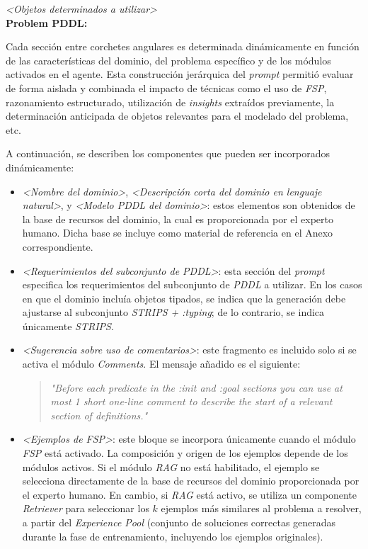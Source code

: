 \begin{anexes}
\begin{tcolorbox}[colback=gray!10!white, colframe=black, title=\textit{Prompt} base del agente modelador propuesto, fonttitle=\bfseries, breakable]
\textit{<Objetos determinados a utilizar>} \\

\textbf{Problem PDDL:}
\end{tcolorbox}

Cada sección entre corchetes angulares es determinada dinámicamente en función de las características del dominio, del problema específico y de los módulos activados en el agente. Esta construcción jerárquica del \textit{prompt} permitió evaluar de forma aislada y combinada el impacto de técnicas como el uso de \textit{FSP}, razonamiento estructurado, utilización de \textit{insights} extraídos previamente, la determinación anticipada de objetos relevantes para el modelado del problema, etc.

A continuación, se describen los componentes que pueden ser incorporados dinámicamente:

\begin{itemize}
    \item \textit{<Nombre del dominio>}, \textit{<Descripción corta del dominio en lenguaje natural>}, y \textit{<Modelo PDDL del dominio>}: estos elementos son obtenidos de la base de recursos del dominio, la cual es proporcionada por el experto humano. Dicha base se incluye como material de referencia en el Anexo correspondiente.

    \item \textit{<Requerimientos del subconjunto de PDDL>}: esta sección del \textit{prompt} especifica los requerimientos del subconjunto de \textit{PDDL} a utilizar. En los casos en que el dominio incluía objetos tipados, se indica que la generación debe ajustarse al subconjunto \textit{STRIPS + :typing}; de lo contrario, se indica únicamente \textit{STRIPS}.

    \item \textit{<Sugerencia sobre uso de comentarios>}: este fragmento es incluido solo si se activa el módulo \textit{Comments}. El mensaje añadido es el siguiente: 

    \begin{quote}
    \textit{"Before each predicate in the :init and :goal sections you can use at most 1 short one-line comment to describe the start of a relevant section of definitions."}
    \end{quote}

    \item \textit{<Ejemplos de FSP>}: este bloque se incorpora únicamente cuando el módulo \textit{FSP} está activado. La composición y origen de los ejemplos depende de los módulos activos. Si el módulo \textit{RAG} no está habilitado, el ejemplo se selecciona directamente de la base de recursos del dominio proporcionada por el experto humano. En cambio, si \textit{RAG} está activo, se utiliza un componente \textit{Retriever} para seleccionar los $k$ ejemplos más similares al problema a resolver, a partir del \textit{Experience Pool} (conjunto de soluciones correctas generadas durante la fase de entrenamiento, incluyendo los ejemplos originales).


\end{itemize}
\end{anexes}
